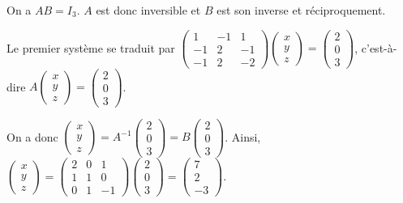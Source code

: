 \documentclass[11pt,fleqn]{book} %
\begin{document}
\begin{solution}

On a $AB=I_3$. $A$ est donc inversible et $B$ est son inverse et réciproquement.

Le premier système se traduit par $\begin{pmatrix}1 & -1 & 1\\ -1 & 2 & -1 \\ -1 & 2 & -2\end{pmatrix}\begin{pmatrix}x\\y\\z\end{pmatrix}=\begin{pmatrix}2\\0\\3\end{pmatrix}$, c'est-à-dire $A\begin{pmatrix}x\\y\\z\end{pmatrix}=\begin{pmatrix}2\\0\\3\end{pmatrix}$. 

On a donc $\begin{pmatrix}x\\y\\z\end{pmatrix}=A^{-1}\begin{pmatrix}2\\0\\3\end{pmatrix}=B\begin{pmatrix}2\\0\\3\end{pmatrix}$. Ainsi, $\begin{pmatrix}x\\y\\z\end{pmatrix}=\begin{pmatrix}2 & 0 & 1 \\ 1&1&0 \\ 0& 1& -1\end{pmatrix}\begin{pmatrix}2\\0\\3\end{pmatrix}=\begin{pmatrix}
7\\2\\-3\end{pmatrix}$.



\end{solution}
\end{document}
